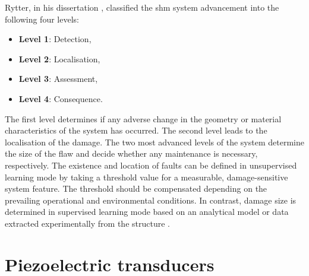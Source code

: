 \documentclass[11pt,a4paper,final]{report}
\theoremstyle{plain}
\begin{document}
Rytter, in his dissertation \cite{rytter1993vibrational}, classified the \ac{shm} system advancement into the following four levels:
\begin{itemize}
	\item[] \textbf{Level 1}: Detection,
	\item[] \textbf{Level 2}: Localisation,
	\item[] \textbf{Level 3}: Assessment,
	\item[] \textbf{Level 4}: Consequence.
\end{itemize}
The first level determines if any adverse change in the geometry or material characteristics of the system has occurred.
The second level leads to the localisation of the damage.
The two most advanced levels of the system determine the size of the flaw and decide whether any maintenance is necessary, respectively.
The existence and location of faults can be defined in unsupervised learning mode by taking a threshold value for a measurable, damage-sensitive system feature. The threshold should be compensated depending on the prevailing operational and environmental conditions.
In contrast, damage size is determined in supervised learning mode based on an analytical model or data extracted experimentally from the structure \cite{worden2007fundamental}. \section{Piezoelectric transducers}
\label{sec:PZT}
\end{document}
